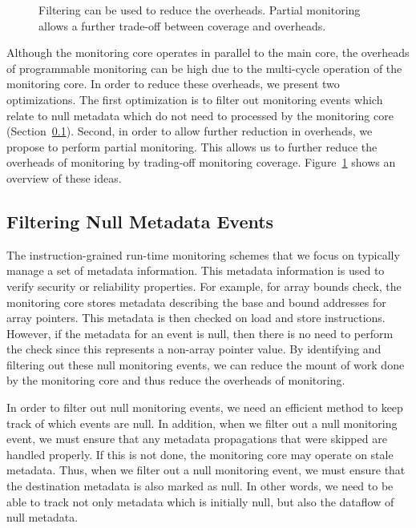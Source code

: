 \begin{figure}
\begin{center}
    \vspace{-0.2in}
    \caption{Filtering can be used to reduce the overheads. Partial monitoring
    allows a further trade-off between coverage and overheads.}
    \label{fig:optimizations.overview}
    \vspace{-0.1in}
  \end{center}
\end{figure}

Although the monitoring core operates in parallel to the main core, the
overheads of programmable monitoring can be high due to the multi-cycle
operation of the monitoring core.
 In order to reduce these overheads, we present two
optimizations. The first optimization is to filter out monitoring events which relate to
null metadata which do not need to processed by the monitoring core (Section~\ref{sec:optimizations.filter}). Second, in order to allow
further reduction in overheads, we propose to perform partial monitoring. This
allows us to further reduce the overheads of monitoring by trading-off
monitoring coverage. Figure~\ref{fig:optimizations.overview} shows an overview
of
these ideas.

\subsection{Filtering Null Metadata Events}
\label{sec:optimizations.filter}

The instruction-grained run-time monitoring schemes that we focus on typically
manage a set of metadata information. This metadata information is used to
verify security or reliability properties. For example, for array bounds
check, the monitoring core stores metadata describing the base and bound
addresses for array pointers. This metadata is then checked on load and store
instructions. However, if the metadata for an event is null, then there is no
need to perform the check since this represents a non-array pointer value. By
identifying and filtering out these null monitoring events, we can reduce the
mount of work done by the monitoring core and thus reduce the overheads of
monitoring.

In order to filter out null monitoring events, we need an efficient method to
keep track of which events are null. In addition, when we filter out a null
monitoring event, we must ensure that any metadata propagations that were
skipped are handled properly. If this is not done, the monitoring core may
operate on stale metadata. Thus, when we filter out a null monitoring event,
we must ensure that the destination metadata is also marked as null. 
In other words, we need to be able to track not only
metadata which is initially null, but also the dataflow of null metadata. 

